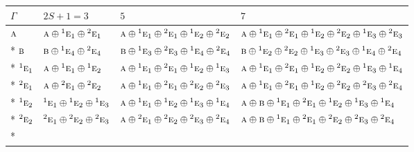 \documentclass[10pt,a4paper]{article}
\numberwithin{equation}{section}
\newcommand{\irr}[1]{\text{\normalfont\scshape #1}}
\newcommand{\conjpair}[1]{{}^{#1}}
\begin{document}
{\small\setlength{\tabcolsep}{3pt}\begin{longtable}{@{}llll@{}}\toprule
$\Gamma$ & $2S + 1 = 3$ & $5$ & $7$\\\midrule\endhead
\bottomrule\endfoot\endlastfoot
$\irr{a}$ & $\irr{a}\oplus \conjpair{1}\irr{e}_{1}\oplus \conjpair{2}\irr{e}_{1}$ & $\irr{a}\oplus \conjpair{1}\irr{e}_{1}\oplus \conjpair{2}\irr{e}_{1}\oplus \conjpair{1}\irr{e}_{2}\oplus \conjpair{2}\irr{e}_{2}$ & $\irr{a}\oplus \conjpair{1}\irr{e}_{1}\oplus \conjpair{2}\irr{e}_{1}\oplus \conjpair{1}\irr{e}_{2}\oplus \conjpair{2}\irr{e}_{2}\oplus \conjpair{1}\irr{e}_{3}\oplus \conjpair{2}\irr{e}_{3}$\\*
$\irr{b}$ & $\irr{b}\oplus \conjpair{1}\irr{e}_{4}\oplus \conjpair{2}\irr{e}_{4}$ & $\irr{b}\oplus \conjpair{1}\irr{e}_{3}\oplus \conjpair{2}\irr{e}_{3}\oplus \conjpair{1}\irr{e}_{4}\oplus \conjpair{2}\irr{e}_{4}$ & $\irr{b}\oplus \conjpair{1}\irr{e}_{2}\oplus \conjpair{2}\irr{e}_{2}\oplus \conjpair{1}\irr{e}_{3}\oplus \conjpair{2}\irr{e}_{3}\oplus \conjpair{1}\irr{e}_{4}\oplus \conjpair{2}\irr{e}_{4}$\\*
$\conjpair{1}\irr{e}_{1}$ & $\irr{a}\oplus \conjpair{1}\irr{e}_{1}\oplus \conjpair{1}\irr{e}_{2}$ & $\irr{a}\oplus \conjpair{1}\irr{e}_{1}\oplus \conjpair{2}\irr{e}_{1}\oplus \conjpair{1}\irr{e}_{2}\oplus \conjpair{1}\irr{e}_{3}$ & $\irr{a}\oplus \conjpair{1}\irr{e}_{1}\oplus \conjpair{2}\irr{e}_{1}\oplus \conjpair{1}\irr{e}_{2}\oplus \conjpair{2}\irr{e}_{2}\oplus \conjpair{1}\irr{e}_{3}\oplus \conjpair{1}\irr{e}_{4}$\\*
$\conjpair{2}\irr{e}_{1}$ & $\irr{a}\oplus \conjpair{2}\irr{e}_{1}\oplus \conjpair{2}\irr{e}_{2}$ & $\irr{a}\oplus \conjpair{1}\irr{e}_{1}\oplus \conjpair{2}\irr{e}_{1}\oplus \conjpair{2}\irr{e}_{2}\oplus \conjpair{2}\irr{e}_{3}$ & $\irr{a}\oplus \conjpair{1}\irr{e}_{1}\oplus \conjpair{2}\irr{e}_{1}\oplus \conjpair{1}\irr{e}_{2}\oplus \conjpair{2}\irr{e}_{2}\oplus \conjpair{2}\irr{e}_{3}\oplus \conjpair{2}\irr{e}_{4}$\\*
$\conjpair{1}\irr{e}_{2}$ & $\conjpair{1}\irr{e}_{1}\oplus \conjpair{1}\irr{e}_{2}\oplus \conjpair{1}\irr{e}_{3}$ & $\irr{a}\oplus \conjpair{1}\irr{e}_{1}\oplus \conjpair{1}\irr{e}_{2}\oplus \conjpair{1}\irr{e}_{3}\oplus \conjpair{1}\irr{e}_{4}$ & $\irr{a}\oplus \irr{b}\oplus \conjpair{1}\irr{e}_{1}\oplus \conjpair{2}\irr{e}_{1}\oplus \conjpair{1}\irr{e}_{2}\oplus \conjpair{1}\irr{e}_{3}\oplus \conjpair{1}\irr{e}_{4}$\\*
$\conjpair{2}\irr{e}_{2}$ & $\conjpair{2}\irr{e}_{1}\oplus \conjpair{2}\irr{e}_{2}\oplus \conjpair{2}\irr{e}_{3}$ & $\irr{a}\oplus \conjpair{2}\irr{e}_{1}\oplus \conjpair{2}\irr{e}_{2}\oplus \conjpair{2}\irr{e}_{3}\oplus \conjpair{2}\irr{e}_{4}$ & $\irr{a}\oplus \irr{b}\oplus \conjpair{1}\irr{e}_{1}\oplus \conjpair{2}\irr{e}_{1}\oplus \conjpair{2}\irr{e}_{2}\oplus \conjpair{2}\irr{e}_{3}\oplus \conjpair{2}\irr{e}_{4}$\\*

\end{longtable}}
\end{document}
